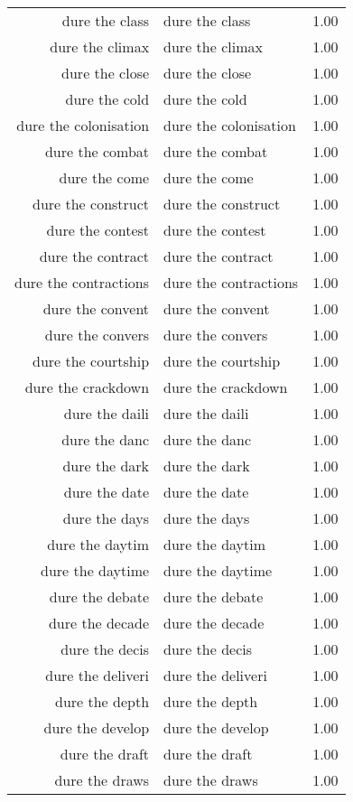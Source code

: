 \begin{table}[ht]
\begin{tabular}{rlr}
  dure the class & dure the class & 1.00 \\ 
  dure the climax & dure the climax & 1.00 \\ 
  dure the close & dure the close & 1.00 \\ 
  dure the cold & dure the cold & 1.00 \\ 
  dure the colonisation & dure the colonisation & 1.00 \\ 
  dure the combat & dure the combat & 1.00 \\ 
  dure the come & dure the come & 1.00 \\ 
  dure the construct & dure the construct & 1.00 \\ 
  dure the contest & dure the contest & 1.00 \\ 
  dure the contract & dure the contract & 1.00 \\ 
  dure the contractions & dure the contractions & 1.00 \\ 
  dure the convent & dure the convent & 1.00 \\ 
  dure the convers & dure the convers & 1.00 \\ 
  dure the courtship & dure the courtship & 1.00 \\ 
  dure the crackdown & dure the crackdown & 1.00 \\ 
  dure the daili & dure the daili & 1.00 \\ 
  dure the danc & dure the danc & 1.00 \\ 
  dure the dark & dure the dark & 1.00 \\ 
  dure the date & dure the date & 1.00 \\ 
  dure the days & dure the days & 1.00 \\ 
  dure the daytim & dure the daytim & 1.00 \\ 
  dure the daytime & dure the daytime & 1.00 \\ 
  dure the debate & dure the debate & 1.00 \\ 
  dure the decade & dure the decade & 1.00 \\ 
  dure the decis & dure the decis & 1.00 \\ 
  dure the deliveri & dure the deliveri & 1.00 \\ 
  dure the depth & dure the depth & 1.00 \\ 
  dure the develop & dure the develop & 1.00 \\ 
  dure the draft & dure the draft & 1.00 \\ 
  dure the draws & dure the draws & 1.00 \\ 

\end{tabular}
\end{table}
